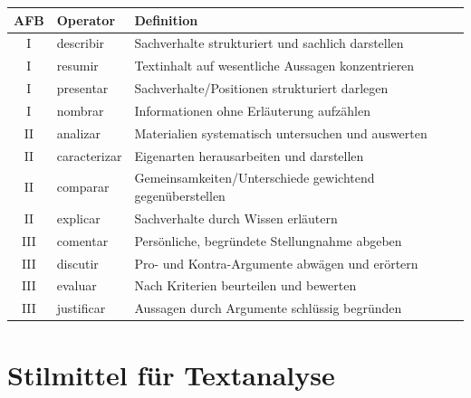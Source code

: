 \documentclass[11pt,a4paper]{article}
\begin{document}
\begin{center}
\footnotesize
\begin{tabularx}{\textwidth}{c|l|X}
\rowcolor{lightblue}
\textbf{AFB} & \textbf{Operator} & \textbf{Definition} \\
\hline
I & describir & Sachverhalte strukturiert und sachlich darstellen \\
\rowcolor{lightgray}
I & resumir & Textinhalt auf wesentliche Aussagen konzentrieren \\
I & presentar & Sachverhalte/Positionen strukturiert darlegen \\
\rowcolor{lightgray}
I & nombrar & Informationen ohne Erläuterung aufzählen \\
\hline
II & analizar & Materialien systematisch untersuchen und auswerten \\
\rowcolor{lightgray}
II & caracterizar & Eigenarten herausarbeiten und darstellen \\
II & comparar & Gemeinsamkeiten/Unterschiede gewichtend gegenüberstellen \\
\rowcolor{lightgray}
II & explicar & Sachverhalte durch Wissen erläutern \\
\hline
III & comentar & Persönliche, begründete Stellungnahme abgeben \\
\rowcolor{lightgray}
III & discutir & Pro- und Kontra-Argumente abwägen und erörtern \\
III & evaluar & Nach Kriterien beurteilen und bewerten \\
\rowcolor{lightgray}
III & justificar & Aussagen durch Argumente schlüssig begründen \\
\hline
\end{tabularx}
\end{center}

\section{Stilmittel für Textanalyse}
\end{document}
